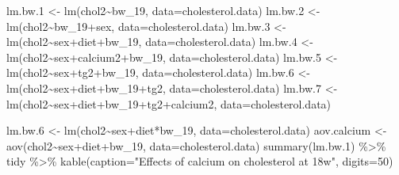 \documentclass[
]{article}
\newenvironment{Shaded}{\begin{snugshade}}{\end{snugshade}}
\newcommand{\AttributeTok}[1]{\textcolor[rgb]{0.77,0.63,0.00}{#1}}
\newcommand{\DecValTok}[1]{\textcolor[rgb]{0.00,0.00,0.81}{#1}}
\newcommand{\FloatTok}[1]{\textcolor[rgb]{0.00,0.00,0.81}{#1}}
\newcommand{\FunctionTok}[1]{\textcolor[rgb]{0.00,0.00,0.00}{#1}}
\newcommand{\NormalTok}[1]{#1}
\newcommand{\OtherTok}[1]{\textcolor[rgb]{0.56,0.35,0.01}{#1}}
\newcommand{\SpecialCharTok}[1]{\textcolor[rgb]{0.00,0.00,0.00}{#1}}
\newcommand{\StringTok}[1]{\textcolor[rgb]{0.31,0.60,0.02}{#1}}
\begin{document}
\begin{Shaded}
\begin{Highlighting}[]
\NormalTok{lm.bw}\FloatTok{.1} \OtherTok{\textless{}{-}} \FunctionTok{lm}\NormalTok{(chol2}\SpecialCharTok{\textasciitilde{}}\NormalTok{bw\_19, }\AttributeTok{data=}\NormalTok{cholesterol.data)}
\NormalTok{lm.bw}\FloatTok{.2} \OtherTok{\textless{}{-}} \FunctionTok{lm}\NormalTok{(chol2}\SpecialCharTok{\textasciitilde{}}\NormalTok{bw\_19}\SpecialCharTok{+}\NormalTok{sex, }\AttributeTok{data=}\NormalTok{cholesterol.data)}
\NormalTok{lm.bw}\FloatTok{.3} \OtherTok{\textless{}{-}} \FunctionTok{lm}\NormalTok{(chol2}\SpecialCharTok{\textasciitilde{}}\NormalTok{sex}\SpecialCharTok{+}\NormalTok{diet}\SpecialCharTok{+}\NormalTok{bw\_19, }\AttributeTok{data=}\NormalTok{cholesterol.data)}
\NormalTok{lm.bw}\FloatTok{.4} \OtherTok{\textless{}{-}} \FunctionTok{lm}\NormalTok{(chol2}\SpecialCharTok{\textasciitilde{}}\NormalTok{sex}\SpecialCharTok{+}\NormalTok{calcium2}\SpecialCharTok{+}\NormalTok{bw\_19, }\AttributeTok{data=}\NormalTok{cholesterol.data)}
\NormalTok{lm.bw}\FloatTok{.5} \OtherTok{\textless{}{-}} \FunctionTok{lm}\NormalTok{(chol2}\SpecialCharTok{\textasciitilde{}}\NormalTok{sex}\SpecialCharTok{+}\NormalTok{tg2}\SpecialCharTok{+}\NormalTok{bw\_19, }\AttributeTok{data=}\NormalTok{cholesterol.data)}
\NormalTok{lm.bw}\FloatTok{.6} \OtherTok{\textless{}{-}} \FunctionTok{lm}\NormalTok{(chol2}\SpecialCharTok{\textasciitilde{}}\NormalTok{sex}\SpecialCharTok{+}\NormalTok{diet}\SpecialCharTok{+}\NormalTok{bw\_19}\SpecialCharTok{+}\NormalTok{tg2, }\AttributeTok{data=}\NormalTok{cholesterol.data)}
\NormalTok{lm.bw}\FloatTok{.7} \OtherTok{\textless{}{-}} \FunctionTok{lm}\NormalTok{(chol2}\SpecialCharTok{\textasciitilde{}}\NormalTok{sex}\SpecialCharTok{+}\NormalTok{diet}\SpecialCharTok{+}\NormalTok{bw\_19}\SpecialCharTok{+}\NormalTok{tg2}\SpecialCharTok{+}\NormalTok{calcium2, }\AttributeTok{data=}\NormalTok{cholesterol.data)}

\NormalTok{lm.bw}\FloatTok{.6} \OtherTok{\textless{}{-}} \FunctionTok{lm}\NormalTok{(chol2}\SpecialCharTok{\textasciitilde{}}\NormalTok{sex}\SpecialCharTok{+}\NormalTok{diet}\SpecialCharTok{*}\NormalTok{bw\_19, }\AttributeTok{data=}\NormalTok{cholesterol.data)}
\NormalTok{aov.calcium }\OtherTok{\textless{}{-}} \FunctionTok{aov}\NormalTok{(chol2}\SpecialCharTok{\textasciitilde{}}\NormalTok{sex}\SpecialCharTok{+}\NormalTok{diet}\SpecialCharTok{+}\NormalTok{bw\_19, }\AttributeTok{data=}\NormalTok{cholesterol.data)}
\FunctionTok{summary}\NormalTok{(lm.bw}\FloatTok{.1}\NormalTok{) }\SpecialCharTok{\%\textgreater{}\%}\NormalTok{ tidy }\SpecialCharTok{\%\textgreater{}\%} \FunctionTok{kable}\NormalTok{(}\AttributeTok{caption=}\StringTok{"Effects of calcium on cholesterol at 18w"}\NormalTok{, }\AttributeTok{digits=}\DecValTok{50}\NormalTok{)}
\end{Highlighting}
\end{Shaded}
\end{document}
